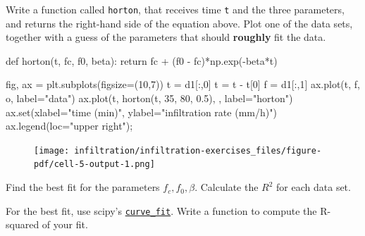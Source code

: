 \documentclass[
  letterpaper,
  DIV=11,
  numbers=noendperiod]{scrreprt}
\newenvironment{Shaded}{\begin{snugshade}}{\end{snugshade}}
\newcommand{\BuiltInTok}[1]{\textcolor[rgb]{0.00,0.23,0.31}{#1}}
\newcommand{\ControlFlowTok}[1]{\textcolor[rgb]{0.00,0.23,0.31}{#1}}
\newcommand{\DecValTok}[1]{\textcolor[rgb]{0.68,0.00,0.00}{#1}}
\newcommand{\FloatTok}[1]{\textcolor[rgb]{0.68,0.00,0.00}{#1}}
\newcommand{\KeywordTok}[1]{\textcolor[rgb]{0.00,0.23,0.31}{#1}}
\newcommand{\NormalTok}[1]{\textcolor[rgb]{0.00,0.23,0.31}{#1}}
\newcommand{\OperatorTok}[1]{\textcolor[rgb]{0.37,0.37,0.37}{#1}}
\newcommand{\StringTok}[1]{\textcolor[rgb]{0.13,0.47,0.30}{#1}}
\begin{document}
Write a function called \texttt{horton}, that receives time \texttt{t}
and the three parameters, and returns the right-hand side of the
equation above. Plot one of the data sets, together with a guess of the
parameters that should \textbf{roughly} fit the data.

\begin{Shaded}
\begin{Highlighting}[]
\KeywordTok{def}\NormalTok{ horton(t, fc, f0, beta):}
    \ControlFlowTok{return}\NormalTok{ fc }\OperatorTok{+}\NormalTok{ (f0 }\OperatorTok{{-}}\NormalTok{ fc)}\OperatorTok{*}\NormalTok{np.exp(}\OperatorTok{{-}}\NormalTok{beta}\OperatorTok{*}\NormalTok{t)}

\NormalTok{fig, ax }\OperatorTok{=}\NormalTok{ plt.subplots(figsize}\OperatorTok{=}\NormalTok{(}\DecValTok{10}\NormalTok{,}\DecValTok{7}\NormalTok{))}
\NormalTok{t }\OperatorTok{=}\NormalTok{ d1[:,}\DecValTok{0}\NormalTok{]}
\NormalTok{t }\OperatorTok{=}\NormalTok{ t }\OperatorTok{{-}}\NormalTok{ t[}\DecValTok{0}\NormalTok{]}
\NormalTok{f }\OperatorTok{=}\NormalTok{ d1[:,}\DecValTok{1}\NormalTok{]}
\NormalTok{ax.plot(t, f, }\StringTok{\textquotesingle{}o\textquotesingle{}}\NormalTok{, label}\OperatorTok{=}\StringTok{"data"}\NormalTok{)}
\NormalTok{ax.plot(t, horton(t, }\DecValTok{35}\NormalTok{, }\DecValTok{80}\NormalTok{, }\FloatTok{0.5}\NormalTok{), }\StringTok{\textquotesingle{}{-}\textquotesingle{}}\NormalTok{, label}\OperatorTok{=}\StringTok{"horton"}\NormalTok{)}
\NormalTok{ax.}\BuiltInTok{set}\NormalTok{(xlabel}\OperatorTok{=}\StringTok{"time (min)"}\NormalTok{,}
\NormalTok{       ylabel}\OperatorTok{=}\StringTok{"infiltration rate (mm/h)"}\NormalTok{)}
\NormalTok{ax.legend(loc}\OperatorTok{=}\StringTok{"upper right"}\NormalTok{)}\OperatorTok{;}
\end{Highlighting}
\end{Shaded}

\begin{figure}[H]

{\centering \texttt{[image: infiltration/infiltration-exercises\_files/figure-pdf/cell-5-output-1.png]}

}

\end{figure}

Find the best fit for the parameters \(f_c, f_0, \beta\). Calculate the
\(R^2\) for each data set.

For the best fit, use scipy's
\href{https://docs.scipy.org/doc/scipy/reference/generated/scipy.optimize.curve_fit.html}{\texttt{curve\_fit}}.
Write a function to compute the R-squared of your fit.
\end{document}
